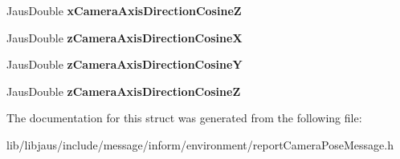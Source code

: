 \begin{DoxyCompactItemize}
\item 
\hypertarget{struct_report_camera_pose_message_struct_aeb01c5dcf8b0d5424349918f1c4acc44}{\-Jaus\-Double {\bfseries x\-Camera\-Axis\-Direction\-Cosine\-Z}}\label{struct_report_camera_pose_message_struct_aeb01c5dcf8b0d5424349918f1c4acc44}

\item 
\hypertarget{struct_report_camera_pose_message_struct_a261fc8f8fff95bb2a952bf1068d72b60}{\-Jaus\-Double {\bfseries z\-Camera\-Axis\-Direction\-Cosine\-X}}\label{struct_report_camera_pose_message_struct_a261fc8f8fff95bb2a952bf1068d72b60}

\item 
\hypertarget{struct_report_camera_pose_message_struct_adad2c5f9e673a8485de53fd25e9221ad}{\-Jaus\-Double {\bfseries z\-Camera\-Axis\-Direction\-Cosine\-Y}}\label{struct_report_camera_pose_message_struct_adad2c5f9e673a8485de53fd25e9221ad}

\item 
\hypertarget{struct_report_camera_pose_message_struct_a349f3f60472bb20cc4a168212bd21a8f}{\-Jaus\-Double {\bfseries z\-Camera\-Axis\-Direction\-Cosine\-Z}}\label{struct_report_camera_pose_message_struct_a349f3f60472bb20cc4a168212bd21a8f}

\end{DoxyCompactItemize}


\-The documentation for this struct was generated from the following file\-:\begin{DoxyCompactItemize}
\item 
lib/libjaus/include/message/inform/environment/report\-Camera\-Pose\-Message.\-h\end{DoxyCompactItemize}
